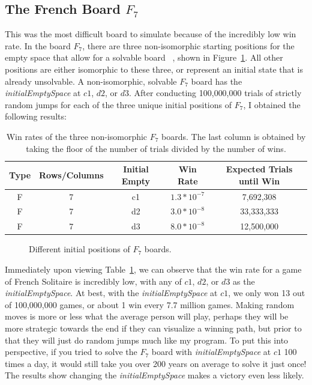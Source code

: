 \documentclass{article}
\begin{document}
\subsection{The French Board $F_7$}
\label{3.1FrenchF7}
This was the most difficult board to simulate because of the incredibly low win rate. In the board $F_7$, there are three non-isomorphic starting positions for the empty space that allow for a solvable board ~\cite{Brassine}, shown in Figure~\ref{fig6}. All other positions are either isomorphic to these three, or represent an initial state that is already unsolvable. A non-isomorphic, solvable $F_7$ board has the \textit{initialEmptySpace} at $c1$, $d2$, or $d3$. After conducting 100,000,000 trials of strictly random jumps for each of the three unique initial positions of $F_7$, I obtained the following results:
\begin{table}[htb]
\begin{center} 
\begin{tabularx}{.88\textwidth}{ c  c  c  c  c }
\hline
\textbf{Type} & \textbf{Rows/Columns} &\textbf{Initial Empty} & \textbf{Win Rate} & \textbf{Expected Trials until Win}\\
\hline
F & 7 & c1 & $1.3*10^{-7}$ & 7,692,308\\

F & 7 & d2 & $3.0*10^{-8}$ & 33,333,333\\

F & 7 & d3 & $8.0*10^{-8}$ & 12,500,000\\

\end{tabularx}
\caption{Win rates of the three non-isomorphic $F_7$ boards. The last column is obtained by taking the floor of the number of trials divided by the number of wins.}
\label{tab1}
\end{center} 
\end{table}

\begin{figure}[htb]
\centering
{}
\caption{Different initial positions of $F_7$ boards.}
\label{fig6}
\end{figure}

Immediately upon viewing Table~\ref{tab1}, we can observe that the win rate for a game of French Solitaire is incredibly low, with any of $c1$, $d2$, or $d3$ as the \textit{initialEmptySpace}. At best, with the \textit{initialEmptySpace} at $c1$, we only won 13 out of 100,000,000 games, or about 1 win every 7.7 million games. Making random moves is more or less what the average person will play, perhaps they will be more strategic towards the end if they can visualize a winning path, but prior to that they will just do random jumps much like my program. To put this into perspective, if you tried to solve the $F_7$ board with \textit{initialEmptySpace} at $c1$ 100 times a day, it would still take you over 200 years on average to solve it just once! The results show changing the \textit{initialEmptySpace} makes a victory even less likely.
\end{document}
